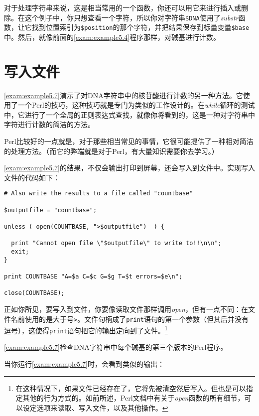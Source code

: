 对于处理字符串来说，这是相当常用的一个函数，你还可以用它来进行插入或删除。在这个例子中，你只想查看一个字符，所以你对字符串\verb|$DNA|使用了\textit{substr}函数，让它找到位置索引为\verb|$position|的那个字符，并把结果保存到标量变量\verb|$base|中。然后，就像前面的\autoref{exam:example5.4}程序那样，对碱基进行计数。

\section{写入文件}
  \autoref{exam:example5.7}演示了对DNA字符串中的核苷酸进行计数的另一种方法。它使用了一个Perl的技巧，这种技巧就是专门为类似的工作设计的。在\textit{while}循环的测试中，它进行了一个全局的正则表达式查找，就像你将看到的，这是一种对字符串中字符进行计数的简洁的方法。

Perl比较好的一点就是，对于那些相当常见的事情，它很可能提供了一种相对简洁的处理方法。（而它的弊端就是对于Perl，有大量知识需要你去学习。）

\autoref{exam:example5.7}的结果，不仅会输出打印到屏幕，还会写入到文件中。实现写入文件的代码如下：

\begin{lstlisting}
# Also write the results to a file called "countbase"

$outputfile = "countbase";

unless ( open(COUNTBASE, ">$outputfile")  ) {

  print "Cannot open file \"$outputfile\" to write to!!\n\n";
  exit;
}

print COUNTBASE "A=$a C=$c G=$g T=$t errors=$e\n";

close(COUNTBASE);
\end{lstlisting}

正如你所见，要写入到文件，你要像读取文件那样调用\textit{open}，但有一点不同：在文件名前使用的是大于号\verb|>|。文件句柄成了\verb|print|语句的第一个参数（但其后并没有逗号），这使得\verb|print|语句把它的输出定向到了文件。\footnote{在这种情况下，如果文件已经存在了，它将先被清空然后写入。但也是可以指定其他的行为方式的。如前所述，Perl文档中有关于\textit{open}函数的所有细节，可以设定选项来读取、写入文件，以及其他操作。}

\autoref{exam:example5.7}检查DNA字符串中每个碱基的第三个版本的Perl程序。



当你运行\autoref{exam:example5.7}时，会看到类似的输出：

